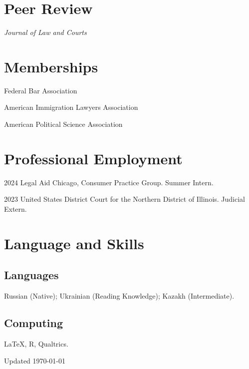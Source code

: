 \documentclass[11pt,letterpaper]{report}
\newcommand{\listitemspace}{0.25em}
\renewenvironment{itemize}
{\begin{list}{}{\setlength{\leftmargin}{0em}
                \setlength{\parskip}{0em}
                \setlength{\itemsep}{\listitemspace}
                \setlength{\parsep}{\listitemspace}}}
{\end{list}}
\begin{document}
    \section*{Peer Review}


    \begin{itemize}

        \item \textit{Journal of Law and Courts}
      

    \end{itemize}

  



    \section*{Memberships}

    \begin{itemize}

        \item Federal Bar Association
        \item American Immigration Lawyers Association
        \item American Political Science Association

    \end{itemize}






 

    \section*{Professional Employment}

    \begin{tablist}

        \item[2024] \tab{}Legal Aid Chicago, Consumer Practice Group. Summer Intern.
        \item[2023] \tab{}United States District Court for the Northern District of Illinois. Judicial Extern.
 

    \end{tablist}


    \section*{Language and Skills}

    \subsection*{Languages}
        Russian (Native); Ukrainian (Reading Knowledge); Kazakh (Intermediate).
    \subsection*{Computing}
        \LaTeX, R, Qualtrics.
    
    \begin{center}
        \vfill
        Updated \monthyeardate\today
    \end{center}
\end{document}
